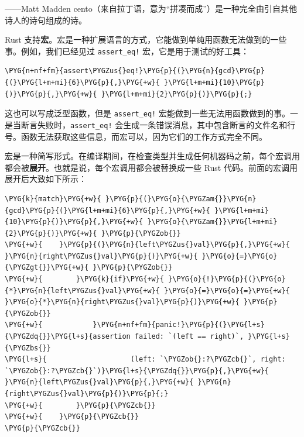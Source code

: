 
\begin{myEpigraph}{——Matt Madden}
cento（来自拉丁语，意为“拼凑而成”）是一种完全由引自其他诗人的诗句组成的诗。
\end{myEpigraph}

Rust 支持\textbf{宏}。宏是一种扩展语言的方式，它能做到单纯用函数无法做到的一些事。例如，我们已经见过 \texttt{assert\_eq!} 宏，它是用于测试的好工具：

\begin{Verbatim}[commandchars=\\\{\},breaklines=true,breakanywhere=true,fontsize=\codefont,xleftmargin=17bp]
\PYG{n+nf+fm}{assert\PYGZus{}eq!}\PYG{p}{(}\PYG{n}{gcd}\PYG{p}{(}\PYG{l+m+mi}{6}\PYG{p}{,}\PYG{+w}{ }\PYG{l+m+mi}{10}\PYG{p}{)}\PYG{p}{,}\PYG{+w}{ }\PYG{l+m+mi}{2}\PYG{p}{)}\PYG{p}{;}
\end{Verbatim}

这也可以写成泛型函数，但是 \texttt{assert\_eq!} 宏能做到一些无法用函数做到的事。一是当断言失败时，\texttt{assert\_eq!} 会生成一条错误消息，其中包含断言的文件名和行号。函数无法获取这些信息，而宏可以，因为它们的工作方式完全不同。

宏是一种简写形式。在编译期间，在检查类型并生成任何机器码之前，每个宏调用都会被\textbf{展开}。也就是说，每个宏调用都会被替换成一些 Rust 代码。前面的宏调用展开后大致如下所示：

\begin{Verbatim}[commandchars=\\\{\},breaklines=true,breakanywhere=true,fontsize=\codefont,xleftmargin=17bp]
\PYG{k}{match}\PYG{+w}{ }\PYG{p}{(}\PYG{o}{\PYGZam{}}\PYG{n}{gcd}\PYG{p}{(}\PYG{l+m+mi}{6}\PYG{p}{,}\PYG{+w}{ }\PYG{l+m+mi}{10}\PYG{p}{)}\PYG{p}{,}\PYG{+w}{ }\PYG{o}{\PYGZam{}}\PYG{l+m+mi}{2}\PYG{p}{)}\PYG{+w}{ }\PYG{p}{\PYGZob{}}
\PYG{+w}{    }\PYG{p}{(}\PYG{n}{left\PYGZus{}val}\PYG{p}{,}\PYG{+w}{ }\PYG{n}{right\PYGZus{}val}\PYG{p}{)}\PYG{+w}{ }\PYG{o}{=}\PYG{o}{\PYGZgt{}}\PYG{+w}{ }\PYG{p}{\PYGZob{}}
\PYG{+w}{        }\PYG{k}{if}\PYG{+w}{ }\PYG{o}{!}\PYG{p}{(}\PYG{o}{*}\PYG{n}{left\PYGZus{}val}\PYG{+w}{ }\PYG{o}{=}\PYG{o}{=}\PYG{+w}{ }\PYG{o}{*}\PYG{n}{right\PYGZus{}val}\PYG{p}{)}\PYG{+w}{ }\PYG{p}{\PYGZob{}}
\PYG{+w}{            }\PYG{n+nf+fm}{panic!}\PYG{p}{(}\PYG{l+s}{\PYGZdq{}}\PYG{l+s}{assertion failed: `(left == right)`, }\PYG{l+s}{\PYGZbs{}}
\PYG{l+s}{                    (left: `\PYGZob{}:?\PYGZcb{}`, right: `\PYGZob{}:?\PYGZcb{}`)}\PYG{l+s}{\PYGZdq{}}\PYG{p}{,}\PYG{+w}{ }\PYG{n}{left\PYGZus{}val}\PYG{p}{,}\PYG{+w}{ }\PYG{n}{right\PYGZus{}val}\PYG{p}{)}\PYG{p}{;}
\PYG{+w}{        }\PYG{p}{\PYGZcb{}}
\PYG{+w}{    }\PYG{p}{\PYGZcb{}}
\PYG{p}{\PYGZcb{}}
\end{Verbatim}

